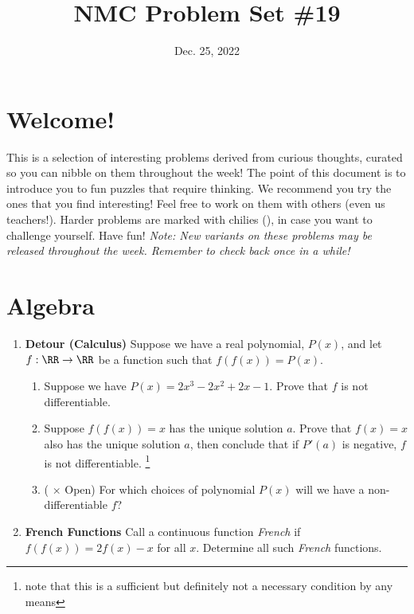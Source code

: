 \documentclass[11pt]{scrartcl}
\begin{document}
\title{NMC Problem Set \#19} %
\date{Dec. 25, 2022} %
\maketitle

\section*{Welcome!}

This is a selection of interesting problems derived from curious thoughts, curated so you can nibble on them throughout the week! The point of this document is to introduce you to fun puzzles that require thinking. We recommend you try the ones that you find interesting! Feel free to work on them with others (even us teachers!). Harder problems are marked with chilies (\fullchili), in case you want to challenge yourself.
\newline\newline
Have fun! \textit{Note: New variants on these problems may be released throughout the week. Remember to check back once in a while!}
    
\section{Algebra}
\begin{enumerate}[label=\textbf{A\arabic*}.]
    \item \textbf{Detour (Calculus)} \newline
    Suppose we have a real polynomial, $P(x)$, and let $f : \RR \to \RR$ be a function such that $f(f(x)) = P(x)$.
    
    \begin{enumerate}
        \item Suppose we have $P(x) = 2x^3 - 2x^2 + 2x - 1$. Prove that $f$ is not differentiable.

        \item Suppose $f(f(x)) = x$ has the unique solution $a$. Prove that $f(x) = x$ also has the unique solution $a$, then conclude that if $P'(a)$ is negative, $f$ is not differentiable. \footnote{note that this is a sufficient but definitely not a necessary condition by any means}

        \item (\fullchili \hspace{1pt} $\times$ Open) For which choices of polynomial $P(x)$ will we have a non-differentiable $f$?
    \end{enumerate}

    \item \textbf{French Functions} \newline
    Call a continuous function \textit{French} if $f(f(x)) = 2f(x) - x$ for all $x$. Determine all such \textit{French} functions.
    
\end{enumerate}
\end{document}
